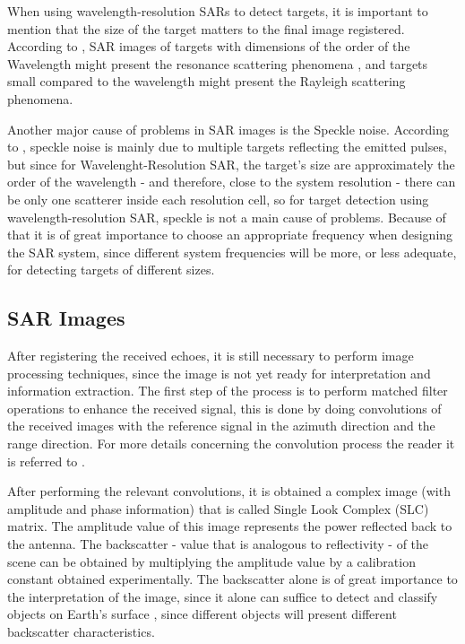 When using wavelength-resolution SARs to detect targets, it is important to mention that the size of the target matters to the final image registered. According to \cite{63}, SAR images of targets with dimensions of the order of the Wavelength might present the resonance scattering phenomena \cite{63}, and targets small compared to the wavelength might present the Rayleigh scattering phenomena\cite{63}. 

Another major cause of problems in SAR images is the Speckle noise. According to \cite{63, 17}, speckle noise is mainly due to multiple targets reflecting the emitted pulses, but since for Wavelenght-Resolution SAR, the target's size are approximately the order of the wavelength - and therefore, close to the system resolution - there can be only one scatterer inside each resolution cell, so for target detection using wavelength-resolution SAR, speckle is not a main cause of problems. Because of that it is of great importance to choose an appropriate frequency when designing the SAR system, since different system frequencies will be more, or less adequate, for detecting targets of different sizes. 

\subsection{SAR Images}
After registering the received echoes, it is still necessary to perform image processing techniques, since the image is not yet ready for interpretation and information extraction\cite{Alberto}. The first step of the process is to perform matched filter operations to enhance the received signal, this is done by doing convolutions of the received images with the reference signal in the azimuth direction and the range direction. For more details concerning the convolution process the reader it is referred to \cite{Alberto, livro}.

After performing the relevant convolutions, it is obtained a complex image (with amplitude and phase information) that is called Single Look Complex (SLC) matrix. The amplitude value of this image represents the power reflected back to the antenna. The backscatter -  value that is analogous to reflectivity - of the scene can be obtained by multiplying the amplitude value by a calibration constant obtained experimentally.
The backscatter alone is of great importance to the interpretation of the image, since it alone can suffice to detect and classify objects on Earth's surface \cite{radiometric}, since different objects will present different backscatter characteristics.

